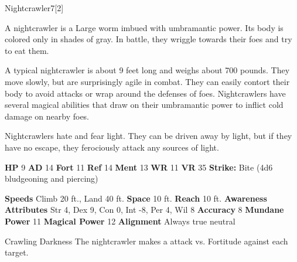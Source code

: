   \begin{monsection}{Nightcrawler}{7}[2]
    \vspace{-1em}\vspace{-1em}
    \vspace{0em}

    
        A nightcrawler is a Large worm imbued with umbramantic power.
        Its body is colored only in shades of gray.
        In battle, they wriggle towards their foes and try to eat them.
      
        A typical nightcrawler is about 9 feet long and weighs about 700 pounds.
        They move slowly, but are surprisingly agile in combat.
        They can easily contort their body to avoid attacks or wrap around the defenses of foes.
        Nightcrawlers have several magical abilities that draw on their umbramantic power to inflict cold damage on nearby foes.
      
        Nightcrawlers hate and fear light.
        They can be driven away by light, but if they have no escape, they ferociously attack any sources of light.
      

    \begin{spellcontent}
      \begin{spelltargetinginfo}
        \pari \textbf{HP} 9 \monsep
          \textbf{AD} 14 \monsep
          \textbf{Fort} 11 \monsep
          \textbf{Ref} 14 \monsep
          \textbf{Ment} 13
        \pari \textbf{WR} 11 \monsep
        \textbf{VR} 35
        \pari \textbf{Strike:}
            Bite  (4d6 bludgeoning and piercing)
      \end{spelltargetinginfo}
    \end{spellcontent}
    \begin{monsterfooter}
      \pari \textbf{Speeds} Climb 20 ft., Land 40 ft. \monsep
        \textbf{Space} 10 ft. \monsep
        \textbf{Reach} 10 ft.
      \pari \textbf{Awareness} 
      \pari \textbf{Attributes}
        Str 4, Dex 9,
        Con 0, Int -8,
        Per 4, Wil 8
      \pari \textbf{Accuracy} 8 \monsep
        \textbf{Mundane Power} 11 \monsep
      \textbf{Magical Power} 12
      \pari \textbf{Alignment} Always true neutral
    \end{monsterfooter}
  \end{monsection}
  \begin{freeability}{Crawling Darkness}
       The nightcrawler makes a  attack
        vs. Fortitude against each target.
    \end{freeability}
  

